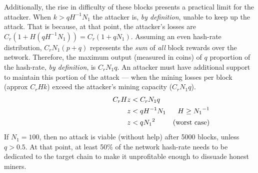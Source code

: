 Additionally, the rise in difficulty of these blocks presents a practical limit for the attacker.
When $k > q H^{-1} N_1$ the attacker is, \emph{by definition}, unable to keep up the attack.
That is because, at that point, the attacker's losses are $C_r (1 + H (q H^{-1} N_1)) = C_r (1 + q N_1)$.
Assuming an even hash-rate distribution, $C_r N_1 (p + q)$ represents the \emph{sum} of \emph{all} block rewards over the network.
Therefore, the maximum output (measured in coins) of $q$ proportion of the hash-rate, \emph{by definition}, is $C_r N_1 q$.
An attacker must have additional support to maintain this portion of the attack --- when the mining losses per block (approx $C_r H k$) exceed the attacker's mining capacity ($C_r N_1 q$).
\begin{align}
    \text{\hspace{8em}}
    && C_r H z &< C_r N_1 q \nonumber \\
    && z &< q H^{-1} N_1 & H \ge {N_1}^{-1} \nonumber \\
    && z &< q {N_1}^2 & \text{(worst case)} \nonumber
\end{align}
If $N_1 = 100$, then no attack is viable (without help) after 5000 blocks, unless $q > 0.5$.
At that point, at least 50\% of the network hash-rate needs to be dedicated to the target chain to make it unprofitable enough to dissuade honest miners.



